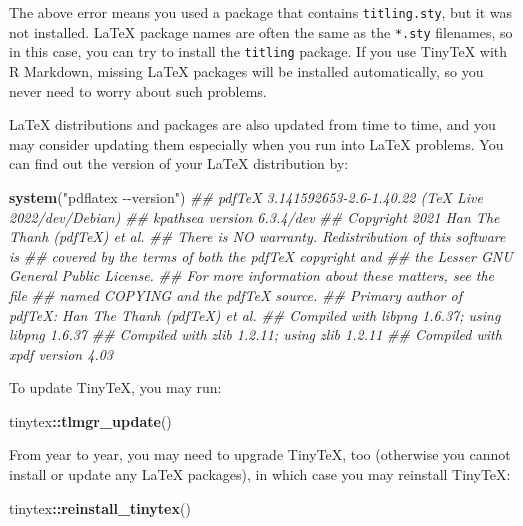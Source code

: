 \documentclass[
  12pt,
]{book}
\newenvironment{Shaded}{\begin{snugshade}}{\end{snugshade}}
\newcommand{\CommentTok}[1]{\textcolor[rgb]{0.56,0.35,0.01}{\textit{#1}}}
\newcommand{\KeywordTok}[1]{\textcolor[rgb]{0.13,0.29,0.53}{\textbf{#1}}}
\newcommand{\NormalTok}[1]{#1}
\newcommand{\OperatorTok}[1]{\textcolor[rgb]{0.81,0.36,0.00}{\textbf{#1}}}
\newcommand{\StringTok}[1]{\textcolor[rgb]{0.31,0.60,0.02}{#1}}
\begin{document}
The above error means you used a package that contains \texttt{titling.sty}, but it was not installed. LaTeX package names are often the same as the \texttt{*.sty} filenames, so in this case, you can try to install the \texttt{titling} package. If you use TinyTeX with R Markdown, missing LaTeX packages will be installed automatically, so you never need to worry about such problems.

LaTeX distributions and packages are also updated from time to time, and you may consider updating them especially when you run into LaTeX problems. You can find out the version of your LaTeX distribution by:

\begin{Shaded}
\begin{Highlighting}[]
\KeywordTok{system}\NormalTok{(}\StringTok{"pdflatex {-}{-}version"}\NormalTok{)}
\CommentTok{\#\# pdfTeX 3.141592653{-}2.6{-}1.40.22 (TeX Live 2022/dev/Debian)}
\CommentTok{\#\# kpathsea version 6.3.4/dev}
\CommentTok{\#\# Copyright 2021 Han The Thanh (pdfTeX) et al.}
\CommentTok{\#\# There is NO warranty.  Redistribution of this software is}
\CommentTok{\#\# covered by the terms of both the pdfTeX copyright and}
\CommentTok{\#\# the Lesser GNU General Public License.}
\CommentTok{\#\# For more information about these matters, see the file}
\CommentTok{\#\# named COPYING and the pdfTeX source.}
\CommentTok{\#\# Primary author of pdfTeX: Han The Thanh (pdfTeX) et al.}
\CommentTok{\#\# Compiled with libpng 1.6.37; using libpng 1.6.37}
\CommentTok{\#\# Compiled with zlib 1.2.11; using zlib 1.2.11}
\CommentTok{\#\# Compiled with xpdf version 4.03}
\end{Highlighting}
\end{Shaded}

To update TinyTeX, you may run:

\begin{Shaded}
\begin{Highlighting}[]
\NormalTok{tinytex}\OperatorTok{::}\KeywordTok{tlmgr\_update}\NormalTok{()}
\end{Highlighting}
\end{Shaded}

From year to year, you may need to upgrade TinyTeX, too (otherwise you cannot install or update any LaTeX packages), in which case you may reinstall TinyTeX:

\begin{Shaded}
\begin{Highlighting}[]
\NormalTok{tinytex}\OperatorTok{::}\KeywordTok{reinstall\_tinytex}\NormalTok{()}
\end{Highlighting}
\end{Shaded}


\printindex
\end{document}
